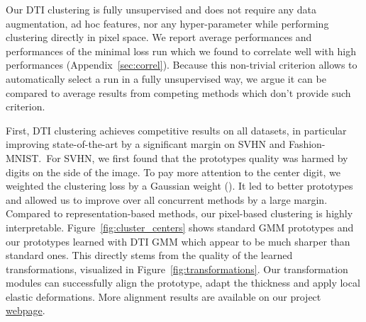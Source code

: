 \documentclass{article}
\begin{document}
\vspace{-0.3em}
Our DTI clustering is fully unsupervised and does not require any data augmentation, ad hoc 
features, nor any hyper-parameter while performing clustering directly in pixel space.  We 
report average performances and performances of the minimal loss run which we found to 
correlate well with high performances (Appendix~\ref{sec:correl}). Because this non-trivial 
criterion allows to automatically select a run in a fully unsupervised way, we argue it can 
be compared to average results from competing methods which don't provide such criterion.
 
\vspace{-0.3em}
First, DTI clustering achieves competitive results on all datasets, in particular improving
state-of-the-art by a significant margin on SVHN and Fashion-MNIST.\ For SVHN, we first found 
that the prototypes quality was harmed by digits on the side of the image. To pay more 
attention to the center digit, we weighted the clustering loss by a Gaussian weight 
(). It led to better prototypes and allowed us to improve over all concurrent 
methods by a large margin. Compared to representation-based methods, our pixel-based 
clustering is highly interpretable.  Figure~\ref{fig:cluster_centers} shows standard GMM 
prototypes and our prototypes learned with DTI GMM which appear to be much sharper than 
standard ones. This directly stems from the quality of the learned transformations, 
visualized in Figure~\ref{fig:transformations}.  Our transformation modules can successfully 
align the prototype, adapt the thickness and apply local elastic deformations. More alignment 
results are available on our project 
\href{http://imagine.enpc.fr/~monniert/DTIClustering/}{webpage}.
\end{document}
